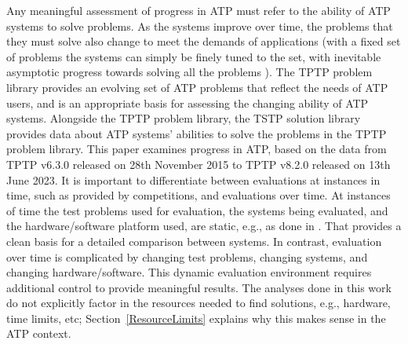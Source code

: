 \documentclass[runningheads]{llncs}
\begin{document}
Any meaningful assessment of progress in ATP must refer to the ability of ATP systems to solve 
problems.
As the systems improve over time, the problems that they must solve also change to meet 
the demands of applications (with a fixed set of problems the systems can simply be finely 
tuned to the set, with inevitable asymptotic progress towards solving all the problems 
\cite{OB+22}).
The TPTP problem library provides an evolving set of ATP problems that reflect the needs of 
ATP users, and is an appropriate basis for assessing the changing ability of ATP systems.
Alongside the TPTP problem library, the TSTP solution library provides data about ATP systems' 
abilities to solve the problems in the TPTP problem library.
This paper examines progress in ATP, based on the data from TPTP v6.3.0 released on 
28th November 2015 to TPTP v8.2.0 released on 13th June 2023.
It is important to differentiate between evaluations at instances in time, such as provided by
competitions, and evaluations over time.
At instances of time the test problems used for evaluation, the systems being evaluated, and
the hardware/software platform used, are static, e.g., as done in \cite{CSW15}.
That provides a clean basis for a detailed comparison between systems.
In contrast, evaluation over time is complicated by changing test problems, changing systems,
and changing hardware/software.
This dynamic evaluation environment requires additional control to provide meaningful results.
The analyses done in this work do not explicitly factor in the resources needed to find solutions, 
e.g., hardware, time limits, etc; Section~\ref{ResourceLimits} explains why this makes sense in 
the ATP context.
\end{document}
